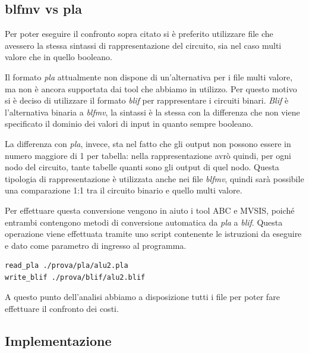 \documentclass[
  italian,
]{book}
\begin{document}
\newpage

\hypertarget{blfmv-vs-pla}{%
\subsection{blfmv vs pla}\label{blfmv-vs-pla}}

Per poter eseguire il confronto sopra citato si è preferito utilizzare file che avessero la stessa sintassi di rappresentazione del circuito, sia nel caso multi valore che in quello booleano.

Il formato \emph{pla} attualmente non dispone di un'alternativa per i file multi valore, ma non è ancora supportata dai tool che abbiamo in utilizzo. Per questo motivo si è deciso di utilizzare il formato \emph{blif} per rappresentare i circuiti binari. \emph{Blif} è l'alternativa binaria a \emph{blfmv}, la sintassi è la stessa con la differenza che non viene specificato il dominio dei valori di input in quanto sempre booleano.

La differenza con \emph{pla}, invece, sta nel fatto che gli output non possono essere in numero maggiore di 1 per tabella: nella rappresentazione avrò quindi, per ogni nodo del circuito, tante tabelle quanti sono gli output di quel nodo. Questa tipologia di rappresentazione è utilizzata anche nei file \emph{blfmv}, quindi sarà possibile una comparazione 1:1 tra il circuito binario e quello multi valore.

Per effettuare questa conversione vengono in aiuto i tool ABC e MVSIS, poiché entrambi contengono metodi di conversione automatica da \emph{pla} a \emph{blif}. Questa operazione viene effettuata tramite uno script contenente le istruzioni da eseguire e dato come parametro di ingresso al programma. \citep{kukimoto1996blif}

\begin{verbatim}
read_pla ./prova/pla/alu2.pla
write_blif ./prova/blif/alu2.blif
\end{verbatim}

A questo punto dell'analisi abbiamo a disposizione tutti i file per poter fare effettuare il confronto dei costi.

\newpage

\hypertarget{implementazione}{%
\subsection{Implementazione}\label{implementazione}}
\end{document}
